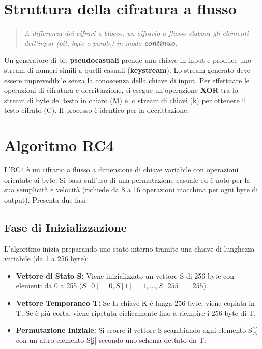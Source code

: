 \documentclass{article}
\begin{document}
\vspace{0.8cm}

\section*{Struttura della cifratura a flusso}

\begin{quote}
    \textit{A differenza dei cifrari a blocco, un cifrario a flusso elabora gli elementi dell'input (bit, byte o parole) in modo \textbf{continuo}.}
\end{quote}

Un generatore di bit \textbf{pseudocasuali} prende una chiave in input e produce uno stream di numeri simili a quelli casuali (\textbf{keystream}). Lo stream generato deve essere imprevedibile senza la conoscenza della chiave di input. Per effettuare le operazioni di cifratura e decrittazione, si esegue un'operazione \textbf{XOR} tra lo stream di byte del testo in chiaro (M) e lo stream di chiavi (k) per ottenere il testo cifrato (C). Il processo è identico per la decrittazione.

\vspace{0.8cm}

\section*{Algoritmo RC4}

L'RC4 è un cifrario a flusso a dimensione di chiave variabile con operazioni orientate ai byte. Si basa sull'uso di una permutazione casuale ed è noto per la sua semplicità e velocità (richiede da 8 a 16 operazioni macchina per ogni byte di output). Presenta due fasi:

\subsection*{Fase di Inizializzazione}

L'algoritmo inizia preparando uno stato interno tramite una chiave di lunghezza variabile (da 1 a 256 byte):

\begin{itemize}
    \item \textbf{Vettore di Stato S:} Viene inizializzato un vettore S di 256 byte con elementi da 0 a 255 ($S[0]=0, S[1]=1, \dots, S[255]=255$).
    \item \textbf{Vettore Temporaneo T:} Se la chiave K è lunga 256 byte, viene copiata in T. Se è più corta, viene ripetuta ciclicamente fino a riempire i 256 byte di T.
    \item \textbf{Permutazione Iniziale:} Si scorre il vettore S scambiando ogni elemento S[i] con un altro elemento S[j] secondo uno schema dettato da T:
\end{itemize}
\end{document}
